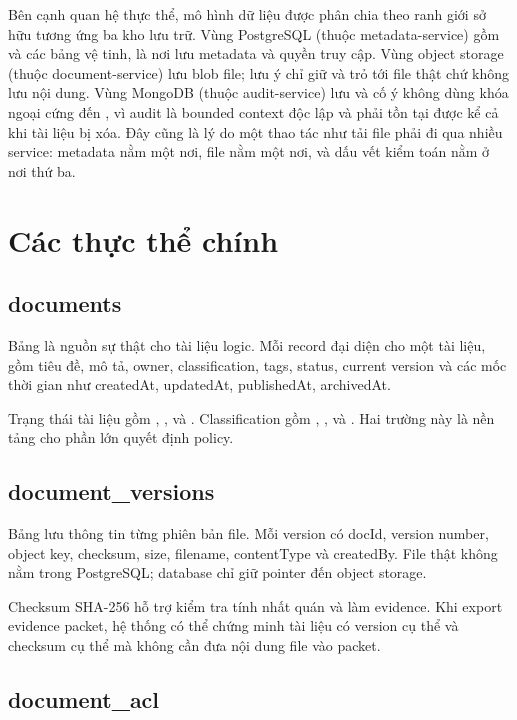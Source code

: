 Bên cạnh quan hệ thực thể, mô hình dữ liệu được phân chia theo ranh giới sở hữu tương ứng ba kho lưu trữ. Vùng PostgreSQL (thuộc metadata-service) gồm  và các bảng vệ tinh, là nơi lưu metadata và quyền truy cập. Vùng object storage (thuộc document-service) lưu blob file; lưu ý  chỉ giữ  và  trỏ tới file thật chứ không lưu nội dung. Vùng MongoDB (thuộc audit-service) lưu  và cố ý không dùng khóa ngoại cứng đến , vì audit là bounded context độc lập và phải tồn tại được kể cả khi tài liệu bị xóa. Đây cũng là lý do một thao tác như tải file phải đi qua nhiều service: metadata nằm một nơi, file nằm một nơi, và dấu vết kiểm toán nằm ở nơi thứ ba.

\section{Các thực thể chính}

\subsection{documents}

Bảng  là nguồn sự thật cho tài liệu logic. Mỗi record đại diện cho một tài liệu, gồm tiêu đề, mô tả, owner, classification, tags, status, current version và các mốc thời gian như createdAt, updatedAt, publishedAt, archivedAt.

Trạng thái tài liệu gồm , ,  và . Classification gồm , ,  và . Hai trường này là nền tảng cho phần lớn quyết định policy.

\subsection{document\_versions}

Bảng  lưu thông tin từng phiên bản file. Mỗi version có docId, version number, object key, checksum, size, filename, contentType và createdBy. File thật không nằm trong PostgreSQL; database chỉ giữ pointer đến object storage.

Checksum SHA-256 hỗ trợ kiểm tra tính nhất quán và làm evidence. Khi export evidence packet, hệ thống có thể chứng minh tài liệu có version cụ thể và checksum cụ thể mà không cần đưa nội dung file vào packet.

\subsection{document\_acl}


